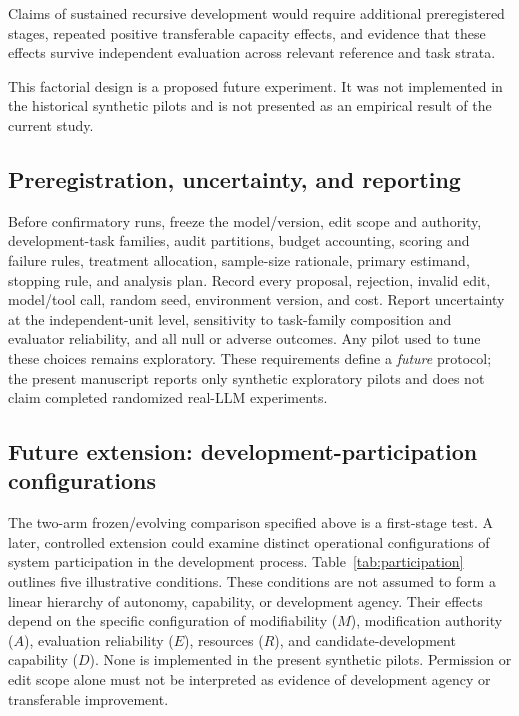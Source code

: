 \documentclass[11pt,a4paper]{article}
\begin{document}
Claims of sustained recursive development would require additional preregistered stages, repeated positive transferable capacity effects, and evidence that these effects survive independent evaluation
across relevant reference and task strata.

This factorial design is a proposed future experiment. It was not implemented in the historical synthetic pilots and is not presented as an empirical result of the current study.

\subsection{Preregistration, uncertainty, and reporting}
Before confirmatory runs, freeze the model/version, edit scope and authority, development-task families, audit partitions, budget accounting, scoring and failure rules, treatment allocation, sample-size rationale, primary estimand, stopping rule, and analysis plan. Record every proposal, rejection, invalid edit, model/tool call, random seed, environment version, and cost. Report uncertainty at the independent-unit level, sensitivity to task-family composition and evaluator reliability, and all null or adverse outcomes. Any pilot used to tune these choices remains exploratory. These requirements define a \emph{future} protocol; the present manuscript reports only synthetic exploratory pilots and does not claim completed randomized real-LLM experiments.

\subsection{Future extension: development-participation configurations}
The two-arm frozen/evolving comparison specified above is a first-stage test. A later, controlled extension could examine distinct operational configurations of system participation in the development process. Table~\ref{tab:participation} outlines five illustrative conditions. These conditions are not assumed to form a linear hierarchy of autonomy, capability, or development agency. Their effects depend on the specific configuration of modifiability (\(M\)), modification authority (\(A\)), evaluation reliability (\(E\)), resources (\(R\)), and candidate-development capability (\(D\)). None is implemented in the present synthetic pilots. Permission or edit scope alone must not be interpreted as evidence of development agency or transferable improvement.
\end{document}
